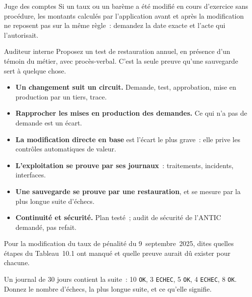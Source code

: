 \begin{boxmetier}{Juge des comptes}
Si un taux ou un barème a été modifié en cours d'exercice sans
procédure, les montants calculés par l'application avant et après la
modification ne reposent pas sur la même règle~: demandez la date exacte
et l'acte qui l'autorisait.
\end{boxmetier}

\begin{boxmetier}{Auditeur interne}
Proposez un test de restauration annuel, en présence d'un témoin du
métier, avec procès-verbal. C'est la seule preuve qu'une sauvegarde
sert à quelque chose.
\end{boxmetier}

\separateur

\begin{boxresume}
\begin{itemize}
    \item \textbf{Un changement suit un circuit.} Demande, test,
          approbation, mise en production par un tiers, trace.
    \item \textbf{Rapprocher les mises en production des demandes.} Ce qui
          n'a pas de demande est un écart.
    \item \textbf{La modification directe en base} est l'écart le plus
          grave~: elle prive les contrôles automatiques de valeur.
    \item \textbf{L'exploitation se prouve par ses journaux}~: traitements,
          incidents, interfaces.
    \item \textbf{Une sauvegarde se prouve par une restauration}, et se
          mesure par la plus longue suite d'échecs.
    \item \textbf{Continuité et sécurité.} Plan testé~; audit de sécurité
          de l'ANTIC demandé, pas refait.
\end{itemize}
\end{boxresume}

\begin{boxexo}[title={\ding{45}\quad Exercice~10.1. Le circuit \niveaubase}]
Pour la modification du taux de pénalité du 9~septembre~2025, dites
quelles étapes du Tableau~10.1 ont manqué et quelle preuve aurait dû
exister pour chacune.
\end{boxexo}

\begin{boxexo}[title={\ding{45}\quad Exercice~10.2. Le journal des sauvegardes \niveaubase}]
Un journal de 30 jours contient la suite~: 10 \texttt{OK}, 3
\texttt{ECHEC}, 5 \texttt{OK}, 4 \texttt{ECHEC}, 8 \texttt{OK}. Donnez le
nombre d'échecs, la plus longue suite, et ce qu'elle signifie.
\end{boxexo}

